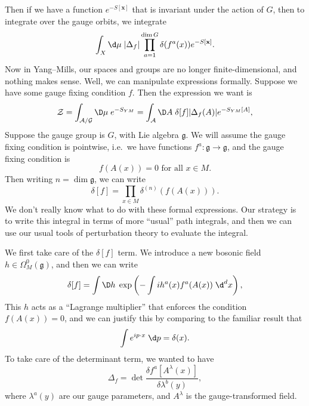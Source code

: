 \documentclass[a4paper]{article}
\begin{document}
Then if we have a function $e^{-S[\mathbf{x}]}$ that is invariant under the action of $G$, then to integrate over the gauge orbits, we integrate
\[
  \int_X \d \mu\; |\Delta_f| \prod_{a = 1}^{\dim G} \delta(f^a(x)) e^{-S[\mathbf{x}]}.
\]
Now in Yang--Mills, our spaces and groups are no longer finite-dimensional, and nothing makes sense. Well, we can manipulate expressions formally. Suppose we have some gauge fixing condition $f$. Then the expression we want is
\[
  \mathcal{Z} = \int_{\mathcal{A}/\mathcal{G}} \D \mu \; e^{-S_{YM}} = \int_\mathcal{A} \D A\; \delta[f] |\Delta_f(A)| e^{-S_{YM}[A]},
\]
Suppose the gauge group is $G$, with Lie algebra $\mathfrak{g}$. We will assume the gauge fixing condition is pointwise, i.e.\ we have functions $f^a: \mathfrak{g} \to \mathfrak{g}$, and the gauge fixing condition is
\[
  f(A(x)) = 0\text{ for all } x\in M.
\]
Then writing $n = \dim \mathfrak{g}$, we can write
\[
  \delta[f] = \prod_{x \in M} \delta^{(n)}(f(A(x))).
\]
We don't really know what to do with these formal expressions. Our strategy is to write this integral in terms of more ``usual'' path integrals, and then we can use our usual tools of perturbation theory to evaluate the integral.

We first take care of the $\delta[f]$ term. We introduce a new bosonic field $h \in \Omega^0_M(\mathfrak{g})$, and then we can write
\[
  \delta[f] = \int \D h\; \exp\left(- \int i h^a(x) f^a(A(x))\;\d^d x\right),
\]
This $h$ acts as a ``Lagrange multiplier'' that enforces the condition $f(A(x)) = 0$, and we can justify this by comparing to the familiar result that
\[
  \int e^{ip\cdot x}\;\d p = \delta(x).
\]
To take care of the determinant term, we wanted to have
\[
  \Delta_f = \det \frac{\delta f^a[A^\lambda(x)]}{\delta \lambda^b (y)},
\]
where $\lambda^a(y)$ are our gauge parameters, and $A^\lambda$ is the gauge-transformed field.
\end{document}
